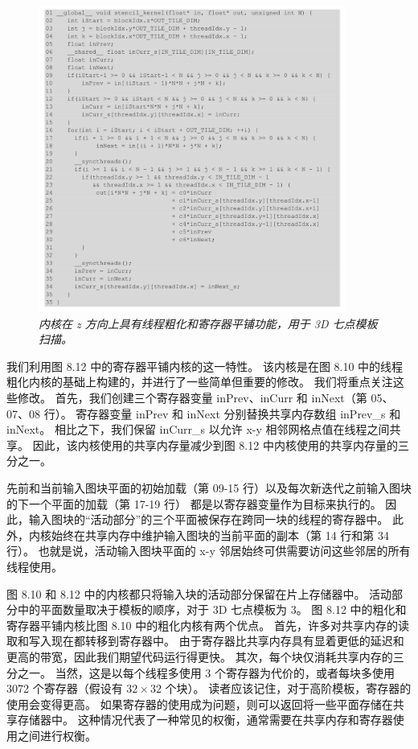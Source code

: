 \begin{figure}[H]
	\centering
	\includegraphics[width=0.9\textwidth]{figs/F8.12.png}
	\caption{\textit{内核在 z 方向上具有线程粗化和寄存器平铺功能，用于 3D 七点模板扫描。}}
\end{figure}

我们利用图 8.12 中的寄存器平铺内核的这一特性。 
该内核是在图 8.10 中的线程粗化内核的基础上构建的，并进行了一些简单但重要的修改。 我们将重点关注这些修改。 
首先，我们创建三个寄存器变量 inPrev、inCurr 和 inNext（第 05、07、08 行）。 
寄存器变量 inPrev 和 inNext 分别替换共享内存数组 inPrev\_s 和 inNext。 
相比之下，我们保留 inCurr\_s 以允许 x-y 相邻网格点值在线程之间共享。 
因此，该内核使用的共享内存量减少到图 8.12 中内核使用的共享内存量的三分之一。

先前和当前输入图块平面的初始加载（第 09-15 行）以及每次新迭代之前输入图块的下一个平面的加载（第 17-19 行）
都是以寄存器变量作为目标来执行的。 因此，输入图块的“活动部分”的三个平面被保存在跨同一块的线程的寄存器中。 
此外，内核始终在共享内存中维护输入图块的当前平面的副本（第 14 行和第 34 行）。 
也就是说，活动输入图块平面的 x-y 邻居始终可供需要访问这些邻居的所有线程使用。

图 8.10 和 8.12 中的内核都只将输入块的活动部分保留在片上存储器中。 
活动部分中的平面数量取决于模板的顺序，对于 3D 七点模板为 3。 
图 8.12 中的粗化和寄存器平铺内核比图 8.10 中的粗化内核有两个优点。 首先，许多对共享内存的读取和写入现在都转移到寄存器中。 
由于寄存器比共享内存具有显着更低的延迟和更高的带宽，因此我们期望代码运行得更快。 其次，每个块仅消耗共享内存的三分之一。 
当然，这是以每个线程多使用 3 个寄存器为代价的，或者每块多使用 3072 个寄存器（假设有 $32 \times 32$ 个块）。 
读者应该记住，对于高阶模板，寄存器的使用会变得更高。 如果寄存器的使用成为问题，则可以返回将一些平面存储在共享存储器中。 
这种情况代表了一种常见的权衡，通常需要在共享内存和寄存器使用之间进行权衡。

